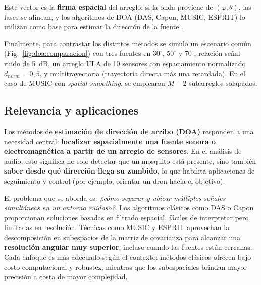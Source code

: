Este vector es la \textbf{firma espacial} del arreglo: 
si la onda proviene de \((\varphi,\theta)\), las fases se alinean, 
y los algoritmos de DOA (DAS, Capon, MUSIC, ESPRIT) lo utilizan como base 
para estimar la dirección de la fuente \cite{YangBook,Gupta2015}.  




  
 

Finalmente, para contrastar los distintos métodos se simuló un escenario común 
(Fig.~\ref{fig:doa:comparacion}) con tres fuentes en $30^\circ$, $50^\circ$ y $70^\circ$, 
relación señal-ruido de 5~dB, un arreglo ULA de 10 sensores con espaciamiento normalizado $d_{norm}=0,5$, 
y multitrayectoria (trayectoria directa más una retardada).  
En el caso de MUSIC con \emph{spatial smoothing}, se emplearon $M-2$ subarreglos solapados.


\subsection{Relevancia y aplicaciones}

Los métodos de \textbf{estimación de dirección de arribo (DOA)} responden a una necesidad central: 
\textbf{localizar espacialmente una fuente sonora o electromagnética a partir de un arreglo de sensores}.  
En el análisis de audio, esto significa no solo detectar que un mosquito está presente, 
sino también \textbf{saber desde qué dirección llega su zumbido}, lo que habilita aplicaciones de seguimiento 
y control (por ejemplo, orientar un dron hacia el objetivo).

El problema que se aborda es: \textit{¿cómo separar y ubicar múltiples señales simultáneas en un entorno ruidoso?}.  
Los algoritmos clásicos como DAS o Capon proporcionan soluciones basadas en filtrado espacial, 
fáciles de interpretar pero limitadas en resolución.  
Técnicas como MUSIC y ESPRIT aprovechan la descomposición en subespacios de la matriz de covarianza 
para alcanzar una \textbf{resolución angular muy superior}, incluso cuando las fuentes están cercanas.  
Cada enfoque es más adecuado según el contexto: métodos clásicos ofrecen bajo costo computacional 
y robustez, mientras que los subespaciales brindan mayor precisión a costa de mayor complejidad.

